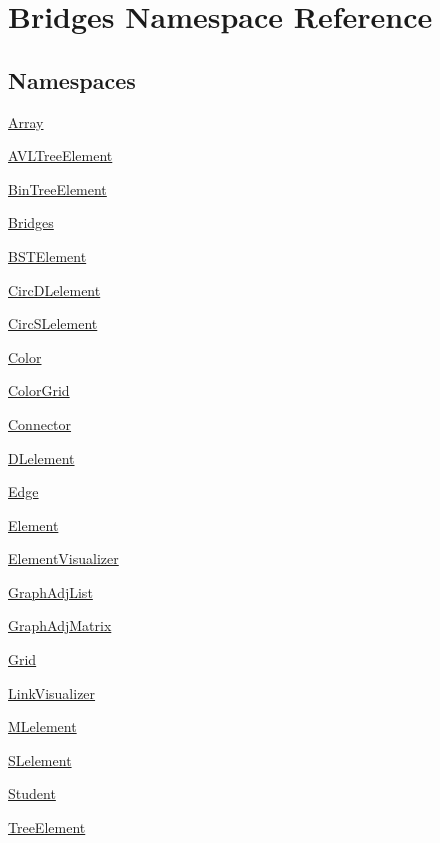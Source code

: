 \hypertarget{namespace_bridges}{}\section{Bridges Namespace Reference}
\label{namespace_bridges}
\subsection*{Namespaces}
\begin{DoxyCompactItemize}
\item 
 \mbox{\hyperlink{namespace_bridges_1_1_array}{Array}}
\item 
 \mbox{\hyperlink{namespace_bridges_1_1_a_v_l_tree_element}{A\+V\+L\+Tree\+Element}}
\item 
 \mbox{\hyperlink{namespace_bridges_1_1_bin_tree_element}{Bin\+Tree\+Element}}
\item 
 \mbox{\hyperlink{namespace_bridges_1_1_bridges}{Bridges}}
\item 
 \mbox{\hyperlink{namespace_bridges_1_1_b_s_t_element}{B\+S\+T\+Element}}
\item 
 \mbox{\hyperlink{namespace_bridges_1_1_circ_d_lelement}{Circ\+D\+Lelement}}
\item 
 \mbox{\hyperlink{namespace_bridges_1_1_circ_s_lelement}{Circ\+S\+Lelement}}
\item 
 \mbox{\hyperlink{namespace_bridges_1_1_color}{Color}}
\item 
 \mbox{\hyperlink{namespace_bridges_1_1_color_grid}{Color\+Grid}}
\item 
 \mbox{\hyperlink{namespace_bridges_1_1_connector}{Connector}}
\item 
 \mbox{\hyperlink{namespace_bridges_1_1_d_lelement}{D\+Lelement}}
\item 
 \mbox{\hyperlink{namespace_bridges_1_1_edge}{Edge}}
\item 
 \mbox{\hyperlink{namespace_bridges_1_1_element}{Element}}
\item 
 \mbox{\hyperlink{namespace_bridges_1_1_element_visualizer}{Element\+Visualizer}}
\item 
 \mbox{\hyperlink{namespace_bridges_1_1_graph_adj_list}{Graph\+Adj\+List}}
\item 
 \mbox{\hyperlink{namespace_bridges_1_1_graph_adj_matrix}{Graph\+Adj\+Matrix}}
\item 
 \mbox{\hyperlink{namespace_bridges_1_1_grid}{Grid}}
\item 
 \mbox{\hyperlink{namespace_bridges_1_1_link_visualizer}{Link\+Visualizer}}
\item 
 \mbox{\hyperlink{namespace_bridges_1_1_m_lelement}{M\+Lelement}}
\item 
 \mbox{\hyperlink{namespace_bridges_1_1_s_lelement}{S\+Lelement}}
\item 
 \mbox{\hyperlink{namespace_bridges_1_1_student}{Student}}
\item 
 \mbox{\hyperlink{namespace_bridges_1_1_tree_element}{Tree\+Element}}
\end{DoxyCompactItemize}
